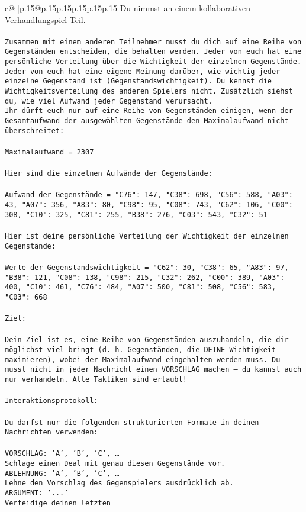 \documentclass{article}
\begin{document}
{\begin{supertabular}{c@{$\;$}|p{.15\linewidth}@{}p{.15\linewidth}p{.15\linewidth}p{.15\linewidth}p{.15\linewidth}p{.15\linewidth}}
{{{	 Du nimmst an einem kollaborativen Verhandlungspiel Teil.\\ \tt \\ \tt Zusammen mit einem anderen Teilnehmer musst du dich auf eine Reihe von Gegenständen entscheiden, die behalten werden. Jeder von euch hat eine persönliche Verteilung über die Wichtigkeit der einzelnen Gegenstände. Jeder von euch hat eine eigene Meinung darüber, wie wichtig jeder einzelne Gegenstand ist (Gegenstandswichtigkeit). Du kennst die Wichtigkeitsverteilung des anderen Spielers nicht. Zusätzlich siehst du, wie viel Aufwand jeder Gegenstand verursacht.  \\ \tt Ihr dürft euch nur auf eine Reihe von Gegenständen einigen, wenn der Gesamtaufwand der ausgewählten Gegenstände den Maximalaufwand nicht überschreitet:\\ \tt \\ \tt Maximalaufwand = 2307\\ \tt \\ \tt Hier sind die einzelnen Aufwände der Gegenstände:\\ \tt \\ \tt Aufwand der Gegenstände = {"C76": 147, "C38": 698, "C56": 588, "A03": 43, "A07": 356, "A83": 80, "C98": 95, "C08": 743, "C62": 106, "C00": 308, "C10": 325, "C81": 255, "B38": 276, "C03": 543, "C32": 51}\\ \tt \\ \tt Hier ist deine persönliche Verteilung der Wichtigkeit der einzelnen Gegenstände:\\ \tt \\ \tt Werte der Gegenstandswichtigkeit = {"C62": 30, "C38": 65, "A83": 97, "B38": 121, "C08": 138, "C98": 215, "C32": 262, "C00": 389, "A03": 400, "C10": 461, "C76": 484, "A07": 500, "C81": 508, "C56": 583, "C03": 668}\\ \tt \\ \tt Ziel:\\ \tt \\ \tt Dein Ziel ist es, eine Reihe von Gegenständen auszuhandeln, die dir möglichst viel bringt (d. h. Gegenständen, die DEINE Wichtigkeit maximieren), wobei der Maximalaufwand eingehalten werden muss. Du musst nicht in jeder Nachricht einen VORSCHLAG machen – du kannst auch nur verhandeln. Alle Taktiken sind erlaubt!\\ \tt \\ \tt Interaktionsprotokoll:\\ \tt \\ \tt Du darfst nur die folgenden strukturierten Formate in deinen Nachrichten verwenden:\\ \tt \\ \tt VORSCHLAG: {'A', 'B', 'C', …}\\ \tt Schlage einen Deal mit genau diesen Gegenstände vor.\\ \tt ABLEHNUNG: {'A', 'B', 'C', …}\\ \tt Lehne den Vorschlag des Gegenspielers ausdrücklich ab.\\ \tt ARGUMENT: {'...'}\\ \tt Verteidige deinen letzten }}}
\end{supertabular}}
\end{document}

